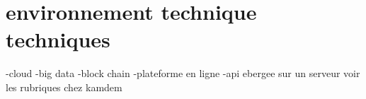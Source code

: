 
\section{environnement technique techniques}
-cloud
-big data
-block chain
-plateforme en ligne
-api ebergee sur un serveur
voir les rubriques chez kamdem
